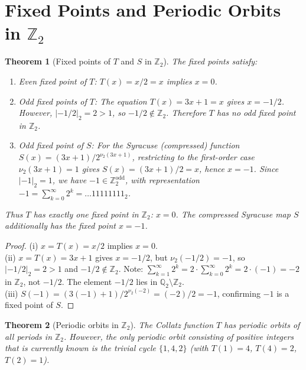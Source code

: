 \documentclass[12pt,a4paper]{article}
\newtheorem{theorem}{Theorem}[section]
\begin{document}
\section{Fixed Points and Periodic Orbits in $\mathbb{Z}_2$}\label{sec:fixed}

\begin{theorem}[Fixed points of $T$ and $S$ in $\mathbb{Z}_2$]\label{thm:fixed}
The fixed points satisfy:
\begin{enumerate}
  \item[(i)] Even fixed point of $T$: $T(x) = x/2 = x$ implies $x = 0$.
  \item[(ii)] Odd fixed points of $T$: The equation $T(x) = 3x+1 = x$ gives $x = -1/2$.
              However, $|-1/2|_2 = 2 > 1$, so $-1/2 \notin \mathbb{Z}_2$. Therefore
              $T$ has \emph{no} odd fixed point in $\mathbb{Z}_2$.
  \item[(iii)] Odd fixed point of $S$: For the Syracuse (compressed) function
              $S(x) = (3x+1)/2^{\nu_2(3x+1)}$, restricting to the first-order case
              $\nu_2(3x+1)=1$ gives $S(x) = (3x+1)/2 = x$, hence $x = -1$.
              Since $|-1|_2 = 1$, we have $-1 \in \mathbb{Z}_2^{\text{odd}}$,
              with representation $-1 = \sum_{k=0}^\infty 2^k = \ldots 11111111_2$.
\end{enumerate}
Thus $T$ has exactly one fixed point in $\mathbb{Z}_2$: $x = 0$.
The compressed Syracuse map $S$ additionally has the fixed point $x = -1$.
\end{theorem}

\begin{proof}
(i) $x = T(x) = x/2$ implies $x = 0$.\\
(ii) $x = T(x) = 3x+1$ gives $x = -1/2$, but $\nu_2(-1/2) = -1$, so $|-1/2|_2 = 2 > 1$
and $-1/2 \notin \mathbb{Z}_2$.
Note: $\sum_{k=1}^\infty 2^k = 2\cdot\sum_{k=0}^\infty 2^k = 2\cdot(-1) = -2$ in $\mathbb{Z}_2$,
not $-1/2$. The element $-1/2$ lies in $\mathbb{Q}_2 \setminus \mathbb{Z}_2$.\\
(iii) $S(-1) = (3(-1)+1)/2^{\nu_2(-2)} = (-2)/2 = -1$, confirming $-1$ is a fixed point of $S$.
\end{proof}

\begin{theorem}[Periodic orbits in $\mathbb{Z}_2$]\label{thm:periodic}
The Collatz function $T$ has periodic orbits of all periods in $\mathbb{Z}_2$.
However, the only periodic orbit consisting of \emph{positive integers} that is currently
known is the trivial cycle $\{1, 4, 2\}$ (with $T(1)=4$, $T(4)=2$, $T(2)=1$).
\end{theorem}
\end{document}
